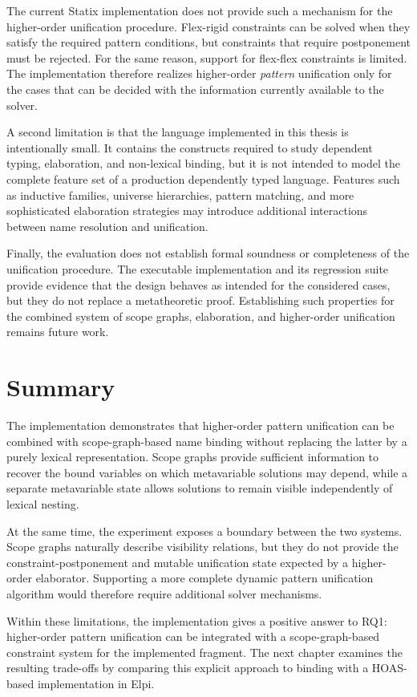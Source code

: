 The current Statix implementation does not provide such a mechanism for the
higher-order unification procedure. Flex-rigid constraints can be solved when
they satisfy the required pattern conditions, but constraints that require
postponement must be rejected. For the same reason, support for flex-flex
constraints is limited. The implementation therefore realizes higher-order
\emph{pattern} unification only for the cases that can be decided with the
information currently available to the solver.

A second limitation is that the language implemented in this thesis is
intentionally small. It contains the constructs required to study dependent
typing, elaboration, and non-lexical binding, but it is not intended to model
the complete feature set of a production dependently typed language. Features
such as inductive families, universe hierarchies, pattern matching, and more
sophisticated elaboration strategies may introduce additional interactions
between name resolution and unification.

Finally, the evaluation does not establish formal soundness or completeness
of the unification procedure. The executable implementation and its regression
suite provide evidence that the design behaves as intended for the considered
cases, but they do not replace a metatheoretic proof. Establishing such
properties for the combined system of scope graphs, elaboration, and
higher-order unification remains future work.

\section{Summary}
\label{sec:evaluation-summary}

The implementation demonstrates that higher-order pattern unification can be
combined with scope-graph-based name binding without replacing the latter by a
purely lexical representation. Scope graphs provide sufficient information to
recover the bound variables on which metavariable solutions may depend, while
a separate metavariable state allows solutions to remain visible independently
of lexical nesting.

At the same time, the experiment exposes a boundary between the two systems.
Scope graphs naturally describe visibility relations, but they do not provide
the constraint-postponement and mutable unification state expected by a
higher-order elaborator. Supporting a more complete dynamic pattern
unification algorithm would therefore require additional solver mechanisms.

Within these limitations, the implementation gives a positive answer to RQ1:
higher-order pattern unification can be integrated with a
scope-graph-based constraint system for the implemented fragment. The next
chapter examines the resulting trade-offs by comparing this explicit approach
to binding with a HOAS-based implementation in Elpi.